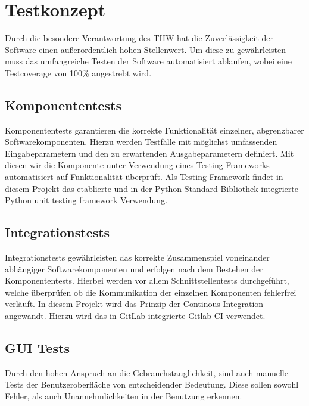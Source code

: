 \section{Testkonzept}
Durch die besondere Verantwortung des THW hat die Zuverlässigkeit der Software einen außerordentlich hohen Stellenwert. Um diese zu gewährleisten muss das umfangreiche Testen der Software automatisiert ablaufen, wobei eine Testcoverage von 100\% angestrebt wird.
\subsection{Komponententests}
Komponententests garantieren die korrekte Funktionalität einzelner, abgrenzbarer Softwarekomponenten. Hierzu werden Testfälle mit möglichst umfassenden Eingabeparametern und den zu erwartenden Ausgabeparametern definiert. Mit diesen wir die Komponente unter Verwendung eines Testing Frameworks automatisiert auf Funktionalität überprüft. Als Testing Framework findet in diesem Projekt das etablierte und in der Python Standard Bibliothek integrierte Python unit testing framework Verwendung.
\subsection{Integrationstests} 
Integrationstests gewährleisten das korrekte Zusammenspiel voneinander abhängiger Softwarekomponenten und erfolgen nach dem Bestehen der Komponententests. Hierbei werden vor allem Schnittstellentests durchgeführt, welche überprüfen ob die Kommunikation der einzelnen Komponenten fehlerfrei verläuft. In diesem Projekt wird das Prinzip der Continous Integration angewandt. Hierzu wird das in GitLab integrierte Gitlab CI verwendet.
\subsection{GUI Tests}
Durch den hohen Anspruch an die Gebrauchstauglichkeit, sind auch manuelle Tests der Benutzeroberfläche von entscheidender Bedeutung. Diese sollen sowohl Fehler, als auch Unannehmlichkeiten in der Benutzung erkennen.